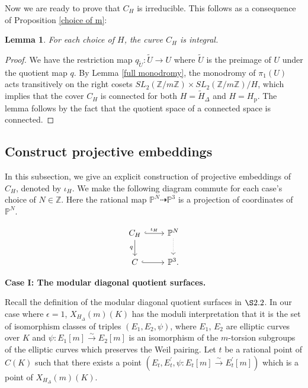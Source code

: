\documentclass[12pt]{amsart}
\newtheorem{lem}[thm]{Lemma}
\theoremstyle{definition}
\theoremstyle{remark}
\numberwithin{equation}{section}
\newcommand{\Z}{\mathbb{Z}}
\renewcommand{\P}{\mathbb{P}}
\begin{document}
Now we are ready to prove that $C_{H}$ is irreducible. This follows as a consequence of Proposition \ref{choice of m}: 

\begin{lem}\label{connected}
For each choice of $H$, the curve $C_{H}$ is integral.	
\end{lem}
\begin{proof}
	We have the restriction map $q_{\tilde{U}}: \tilde{U} \to U$ where $\tilde{U}$ is the preimage of $U$ under the quotient map $q$. By Lemma \ref{full monodromy}, the monodromy of $\pi_{1}(U)$ acts transitively on the right cosets $SL_{2}(\Z/m\Z) \times SL_{2}(\Z/m\Z) / H$, which implies that the cover $C_{H}$ is connected for both $H= \tilde{H}_{\Delta}$ and $H=H_{\operatorname{p}}$. The lemma follows by the fact that the quotient space of a connected space is connected. 
  
\end{proof}


 \subsection{Construct projective embeddings}
In this subsection, we give an explicit construction of projective embeddings of $C_{H}$, denoted by $\iota_{H}$. We make the following diagram commute for each case's choice of $N \in \Z$. Here the rational map $\P^{N} \dashrightarrow \P^{3}$ is a projection of coordinates of $\P^N$.
 
\begin{equation}\label{embedding}
\begin{tikzcd}
 C_{H}   \arrow[r, hook, "\iota_{H}"] \arrow[d, "q", swap] & \P^{N} \arrow[d, dotted]   \\
 C   \arrow[r, hook] & \P^{3}. 	
\end{tikzcd} 
\end{equation}

  \noindent \textbf{Case I: The modular diagonal quotient surfaces.}
  
  Recall the definition of the modular diagonal quotient surfaces in $\S 2.2$. In our case where $\epsilon=1$, $X_{H_{\Delta}}(m)(K)$ has the moduli interpretation that it is the set of isomorphism classes of triples $\left(E_{1}, E_{2}, \psi\right)$, where $E_{1}$, $E_{2}$ are elliptic curves over $K$ and $\psi: E_{1}[m] \stackrel{\sim}{\rightarrow} E_{2}[m]$ is an isomorphism of the $m$-torsion subgroups of the elliptic curves which preserves the Weil pairing. 
Let $t$ be a rational point of $C(K)$ such that there exists a point $(E_{t},E_{t}^{\prime}, \psi: E_{t}[m] \stackrel{\sim}{\rightarrow} E_{t}^{\prime}[m])$ which is a point of $X_{H_{\Delta}}(m)(K)$. 
\end{document}

